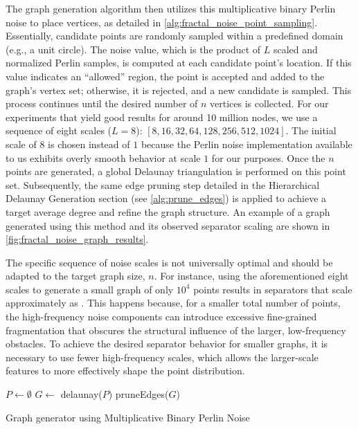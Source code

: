 The graph generation algorithm then utilizes this multiplicative binary Perlin noise to place vertices, as detailed in \cref{alg:fractal_noise_point_sampling}.
Essentially, candidate points are randomly sampled within a predefined domain (e.g., a unit circle). The noise value, which is the product of \(L\) scaled and normalized Perlin samples, is computed at each candidate point's location. If this value indicates an \enquote{allowed} region, the point is accepted and added to the graph's vertex set; otherwise, it is rejected, and a new candidate is sampled. This process continues until the desired number of \(n\) vertices is collected.
For our experiments that yield good results for around 10 million nodes, we use a sequence of eight scales (\(L=8\)): \([8, 16, 32, 64, 128, 256, 512, 1024]\). The initial scale of \(8\) is chosen instead of \(1\) because the Perlin noise implementation available to us exhibits overly smooth behavior at scale \(1\) for our purposes.
Once the \(n\) points are generated, a global Delaunay triangulation is performed on this point set. Subsequently, the same edge pruning step detailed in the Hierarchical Delaunay Generation section (see \cref{alg:prune_edges}) is applied to achieve a target average degree and refine the graph structure.
An example of a graph generated using this method and its observed separator scaling are shown in \cref{fig:fractal_noise_graph_results}.

The specific sequence of noise scales is not universally optimal and should be adapted to the target graph size, \(n\).
For instance, using the aforementioned eight scales to generate a small graph of only \(10^4\) points results in separators that scale approximately as .
This happens because, for a smaller total number of points, the high-frequency noise components can introduce excessive fine-grained fragmentation that obscures the structural influence of the larger, low-frequency obstacles.
To achieve the desired separator behavior for smaller graphs, it is necessary to use fewer high-frequency scales, which allows the larger-scale features to more effectively shape the point distribution.

\begin{algorithm}[tbhp]
	\BlankLine
	\(P \longleftarrow \emptyset\)\;
	\(G \longleftarrow\) delaunay(\(P\))\;
	pruneEdges(\(G\))\;
	\;
	\caption{Graph generator using Multiplicative Binary Perlin Noise}
	\label{alg:fractal_noise_point_sampling}
\end{algorithm}


